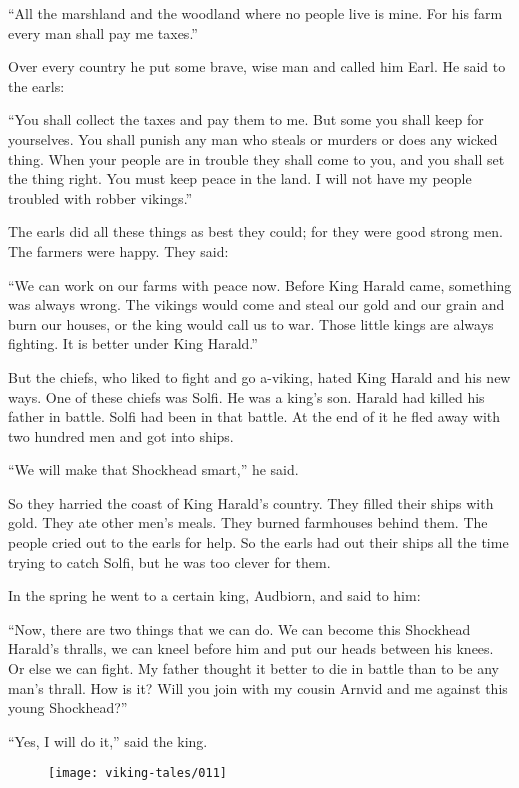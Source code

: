 ``All the marshland and the woodland where no people live is mine. For
his farm every man shall pay me taxes.''

Over every country he put some brave, wise man and called him Earl. He
said to the earls:

``You shall collect the taxes and pay them to me. But some you shall
keep for yourselves. You shall punish any man who steals or murders or
does any wicked thing. When your people are in trouble they shall come
to you, and you shall set the thing right. You must keep peace in the
land. I will not have my people troubled with robber vikings.''

The earls did all these things as best they could; for they were good
strong men. The farmers were happy. They said:

``We can work on our farms with peace now. Before King Harald came,
something was always wrong. The vikings would come and steal our gold
and our grain and burn our houses, or the king would call us to war.
Those little kings are always fighting. It is better under King
Harald.''

But the chiefs, who liked to fight and go a-viking, hated King Harald
and his new ways. One of these chiefs was Solfi. He was a king's son.
Harald had killed his father in battle. Solfi had been in that battle.
At the end of it he fled away with two hundred men and got into ships.

``We will make that Shockhead smart,'' he said.

So they harried the coast of King Harald's country. They filled their
ships with gold. They ate other men's meals. They burned farmhouses
behind them. The people cried out to the earls for help. So the earls
had out their ships all the time trying to catch Solfi, but he was too
clever for them.

In the spring he went to a certain king, Audbiorn, and said to him:

``Now, there are two things that we can do. We can become this Shockhead
Harald's thralls, we can kneel before him and put our heads between his
knees. Or else we can fight. My father thought it better to die in
battle than to be any man's thrall. How is it? Will you join with my
cousin Arnvid and me against this young Shockhead?''

``Yes, I will do it,'' said the king.

\begin{figure}[hb]
    \centering
    \vskip8pt
    \texttt{[image: viking-tales/011]}
\end{figure}
